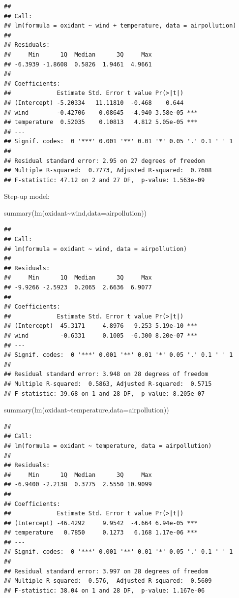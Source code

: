 \documentclass[
]{article}
\newenvironment{Shaded}{\begin{snugshade}}{\end{snugshade}}
\newcommand{\AttributeTok}[1]{\textcolor[rgb]{0.77,0.63,0.00}{#1}}
\newcommand{\FunctionTok}[1]{\textcolor[rgb]{0.00,0.00,0.00}{#1}}
\newcommand{\NormalTok}[1]{#1}
\newcommand{\SpecialCharTok}[1]{\textcolor[rgb]{0.00,0.00,0.00}{#1}}
\begin{document}
\begin{verbatim}
## 
## Call:
## lm(formula = oxidant ~ wind + temperature, data = airpollution)
## 
## Residuals:
##     Min      1Q  Median      3Q     Max 
## -6.3939 -1.8608  0.5826  1.9461  4.9661 
## 
## Coefficients:
##             Estimate Std. Error t value Pr(>|t|)    
## (Intercept) -5.20334   11.11810  -0.468    0.644    
## wind        -0.42706    0.08645  -4.940 3.58e-05 ***
## temperature  0.52035    0.10813   4.812 5.05e-05 ***
## ---
## Signif. codes:  0 '***' 0.001 '**' 0.01 '*' 0.05 '.' 0.1 ' ' 1
## 
## Residual standard error: 2.95 on 27 degrees of freedom
## Multiple R-squared:  0.7773, Adjusted R-squared:  0.7608 
## F-statistic: 47.12 on 2 and 27 DF,  p-value: 1.563e-09
\end{verbatim}

Step-up model:

\begin{Shaded}
\begin{Highlighting}[]
\FunctionTok{summary}\NormalTok{(}\FunctionTok{lm}\NormalTok{(oxidant}\SpecialCharTok{\textasciitilde{}}\NormalTok{wind,}\AttributeTok{data=}\NormalTok{airpollution))}
\end{Highlighting}
\end{Shaded}

\begin{verbatim}
## 
## Call:
## lm(formula = oxidant ~ wind, data = airpollution)
## 
## Residuals:
##     Min      1Q  Median      3Q     Max 
## -9.9266 -2.5923  0.2065  2.6636  6.9077 
## 
## Coefficients:
##             Estimate Std. Error t value Pr(>|t|)    
## (Intercept)  45.3171     4.8976   9.253 5.19e-10 ***
## wind         -0.6331     0.1005  -6.300 8.20e-07 ***
## ---
## Signif. codes:  0 '***' 0.001 '**' 0.01 '*' 0.05 '.' 0.1 ' ' 1
## 
## Residual standard error: 3.948 on 28 degrees of freedom
## Multiple R-squared:  0.5863, Adjusted R-squared:  0.5715 
## F-statistic: 39.68 on 1 and 28 DF,  p-value: 8.205e-07
\end{verbatim}

\begin{Shaded}
\begin{Highlighting}[]
\FunctionTok{summary}\NormalTok{(}\FunctionTok{lm}\NormalTok{(oxidant}\SpecialCharTok{\textasciitilde{}}\NormalTok{temperature,}\AttributeTok{data=}\NormalTok{airpollution))}
\end{Highlighting}
\end{Shaded}

\begin{verbatim}
## 
## Call:
## lm(formula = oxidant ~ temperature, data = airpollution)
## 
## Residuals:
##     Min      1Q  Median      3Q     Max 
## -6.9400 -2.2138  0.3775  2.5550 10.9099 
## 
## Coefficients:
##             Estimate Std. Error t value Pr(>|t|)    
## (Intercept) -46.4292     9.9542  -4.664 6.94e-05 ***
## temperature   0.7850     0.1273   6.168 1.17e-06 ***
## ---
## Signif. codes:  0 '***' 0.001 '**' 0.01 '*' 0.05 '.' 0.1 ' ' 1
## 
## Residual standard error: 3.997 on 28 degrees of freedom
## Multiple R-squared:  0.576,  Adjusted R-squared:  0.5609 
## F-statistic: 38.04 on 1 and 28 DF,  p-value: 1.167e-06
\end{verbatim}
\end{document}
